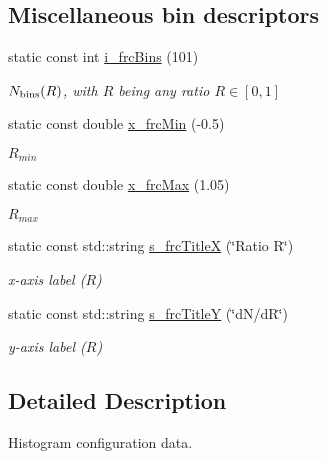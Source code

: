 \subsection*{Miscellaneous bin descriptors}
\begin{CompactItemize}
\item 
\hypertarget{namespaceHistGroupCfg_3c1dbec31c6619ebd98823a476291b6c}{
static const int \hyperlink{namespaceHistGroupCfg_3c1dbec31c6619ebd98823a476291b6c}{i\_\-frc\-Bins} (101)}
\label{namespaceHistGroupCfg_3c1dbec31c6619ebd98823a476291b6c}

\begin{CompactList}\small\item\em $N_{\rm bins}(R)$, with $R$ being any ratio $R\in [0,1]$ \item\end{CompactList}\item 
\hypertarget{namespaceHistGroupCfg_33fbe4a3f831c9000a94caa97707722c}{
static const double \hyperlink{namespaceHistGroupCfg_33fbe4a3f831c9000a94caa97707722c}{x\_\-frc\-Min} (-0.5)}
\label{namespaceHistGroupCfg_33fbe4a3f831c9000a94caa97707722c}

\begin{CompactList}\small\item\em $R_{min}$ \item\end{CompactList}\item 
\hypertarget{namespaceHistGroupCfg_6db3031aa45842a0f22e3c5199a4989d}{
static const double \hyperlink{namespaceHistGroupCfg_6db3031aa45842a0f22e3c5199a4989d}{x\_\-frc\-Max} (1.05)}
\label{namespaceHistGroupCfg_6db3031aa45842a0f22e3c5199a4989d}

\begin{CompactList}\small\item\em $R_{max}$ \item\end{CompactList}\item 
\hypertarget{namespaceHistGroupCfg_3eff5135230264509e3072814024027a}{
static const std::string \hyperlink{namespaceHistGroupCfg_3eff5135230264509e3072814024027a}{s\_\-frc\-Title\-X} (\char`\"{}Ratio R\char`\"{})}
\label{namespaceHistGroupCfg_3eff5135230264509e3072814024027a}

\begin{CompactList}\small\item\em x-axis label ($R$) \item\end{CompactList}\item 
\hypertarget{namespaceHistGroupCfg_1211519500f0a3675f4895e0135a1adc}{
static const std::string \hyperlink{namespaceHistGroupCfg_1211519500f0a3675f4895e0135a1adc}{s\_\-frc\-Title\-Y} (\char`\"{}d\-N/d\-R\char`\"{})}
\label{namespaceHistGroupCfg_1211519500f0a3675f4895e0135a1adc}

\begin{CompactList}\small\item\em y-axis label ($R$) \item\end{CompactList}\end{CompactItemize}


\subsection{Detailed Description}
Histogram configuration data. 